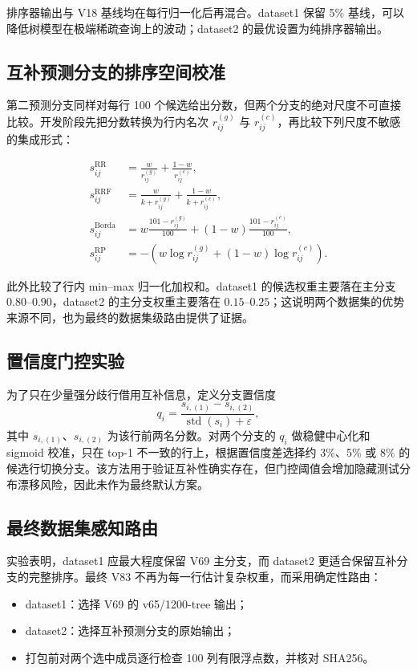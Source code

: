 \documentclass[UTF8,a4paper,11pt]{ctexart}
\begin{document}
排序器输出与 V18 基线均在每行归一化后再混合。dataset1 保留 5\% 基线，可以降低树模型在极端稀疏查询上的波动；dataset2 的最优设置为纯排序器输出。

\subsection{互补预测分支的排序空间校准}

第二预测分支同样对每行 100 个候选给出分数，但两个分支的绝对尺度不可直接比较。开发阶段先把分数转换为行内名次 $r^{(g)}_{ij}$ 与 $r^{(c)}_{ij}$，再比较下列尺度不敏感的集成形式：

\begin{align*}
s^{\mathrm{RR}}_{ij}
&=\frac{w}{r^{(g)}_{ij}}+\frac{1-w}{r^{(c)}_{ij}},\\
s^{\mathrm{RRF}}_{ij}
&=\frac{w}{k+r^{(g)}_{ij}}+\frac{1-w}{k+r^{(c)}_{ij}},\\
s^{\mathrm{Borda}}_{ij}
&=w\frac{101-r^{(g)}_{ij}}{100}+(1-w)\frac{101-r^{(c)}_{ij}}{100},\\
s^{\mathrm{RP}}_{ij}
&=-\left(w\log r^{(g)}_{ij}+(1-w)\log r^{(c)}_{ij}\right).
\end{align*}

此外比较了行内 min--max 归一化加权和。dataset1 的候选权重主要落在主分支 $0.80$--$0.90$，dataset2 的主分支权重主要落在 $0.15$--$0.25$；这说明两个数据集的优势来源不同，也为最终的数据集级路由提供了证据。

\subsection{置信度门控实验}

为了只在少量强分歧行借用互补信息，定义分支置信度
\[
q_i=\frac{s_{i,(1)}-s_{i,(2)}}{\operatorname{std}(s_i)+\varepsilon},
\]
其中 $s_{i,(1)}$、$s_{i,(2)}$ 为该行前两名分数。对两个分支的 $q_i$ 做稳健中心化和 sigmoid 校准，只在 top-1 不一致的行上，根据置信度差选择约 3\%、5\% 或 8\% 的候选行切换分支。该方法用于验证互补性确实存在，但门控阈值会增加隐藏测试分布漂移风险，因此未作为最终默认方案。

\subsection{最终数据集感知路由}

实验表明，dataset1 应最大程度保留 V69 主分支，而 dataset2 更适合保留互补分支的完整排序。最终 V83 不再为每一行估计复杂权重，而采用确定性路由：

\begin{itemize}
  \item dataset1：选择 V69 的 v65/1200-tree 输出；
  \item dataset2：选择互补预测分支的原始输出；
  \item 打包前对两个选中成员逐行检查 100 列有限浮点数，并核对 SHA256。
\end{itemize}
\end{document}
